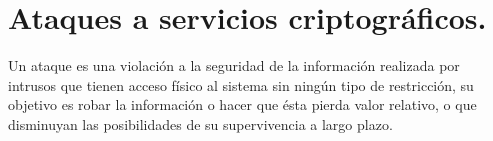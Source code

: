 \section{Ataques a servicios criptográficos. }
Un ataque es una violación a la seguridad de la información realizada por intrusos que tienen acceso físico al sistema sin ningún tipo de restricción, su objetivo es robar la información o hacer que ésta pierda valor relativo, o que disminuyan las posibilidades de su supervivencia a largo plazo.



